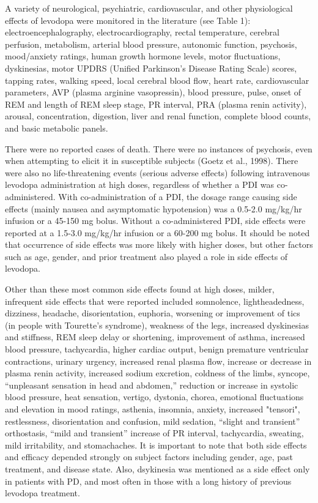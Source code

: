A variety of neurological, psychiatric, cardiovascular, and other physiological effects of levodopa  were monitored in the literature (see Table 1): electroencephalography, electrocardiography, rectal temperature, cerebral perfusion, metabolism, arterial blood pressure, autonomic function, psychosis, mood/anxiety ratings, human growth hormone levels, motor fluctuations, dyskinesias, motor UPDRS (Unified Parkinson’s Disease Rating Scale) scores, tapping rates, walking speed, local cerebral blood flow, heart rate, cardiovascular parameters, AVP (plasma arginine vasopressin), blood pressure, pulse, onset of REM and length of REM sleep stage, PR interval, PRA (plasma renin activity), arousal, concentration, digestion, liver and renal function, complete blood counts, and basic metabolic panels.

There were no reported cases of death.  There were no instances of psychosis, even when attempting to elicit it in susceptible subjects (Goetz et al., 1998).  There were also no life-threatening events (serious adverse effects) following intravenous levodopa administration at high doses, regardless of whether a PDI was co-administered.  With co-administration of a PDI, the dosage range causing side effects (mainly nausea and asymptomatic hypotension) was a 0.5-2.0 mg/kg/hr infusion or a 45-150 mg bolus.  Without a co-administered PDI, side effects were reported at a 1.5-3.0 mg/kg/hr infusion or a 60-200 mg bolus. It should be noted that occurrence of side effects was more likely with higher doses, but other factors such as age, gender, and prior treatment also played a role in side effects of levodopa.  

Other than these most common side effects found at high doses, milder, infrequent side effects that were reported included somnolence, lightheadedness, dizziness, headache, disorientation, euphoria, worsening or improvement of tics (in people with Tourette’s syndrome), weakness of the legs, increased dyskinesias and stiffness, REM sleep delay or shortening, improvement of asthma, increased blood pressure, tachycardia, higher cardiac output, benign premature ventricular contractions, urinary urgency, increased renal plasma flow, increase or decrease in plasma renin activity, increased sodium excretion, coldness of the limbs, syncope, “unpleasant sensation in head and abdomen,” reduction or increase in systolic blood pressure, heat sensation, vertigo, dystonia, chorea, emotional fluctuations and elevation in mood ratings, asthenia, insomnia, anxiety, increased "tensori", restlessness, disorientation and confusion, mild sedation, “slight and transient” orthostasis, “mild and transient” increase of PR interval, tachycardia, sweating, mild irritability, and stomachaches.  It is important to note that both side effects and efficacy depended strongly on subject factors including gender, age, past treatment, and disease state.  Also, dsykinesia was mentioned as a side effect only in patients with PD, and most often in those with a long history of previous levodopa treatment.

